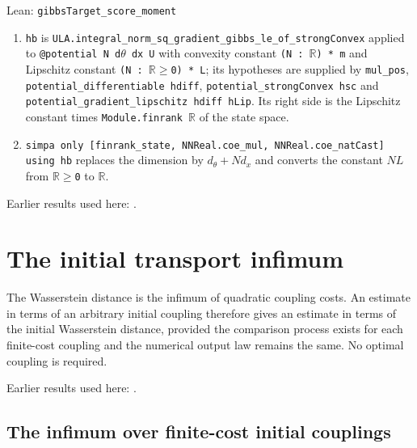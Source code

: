 \documentclass[11pt,a4paper]{report}
\begin{document}
\begin{leanbox}{Lean: \texttt{gibbsTarget\_\allowbreak{}score\_\allowbreak{}moment}}
\begin{enumerate}
\item \texttt{hb} is \texttt{ULA.\allowbreak{}integral\_\allowbreak{}norm\_\allowbreak{}sq\_\allowbreak{}gradient\_\allowbreak{}gibbs\_\allowbreak{}le\_\allowbreak{}of\_\allowbreak{}strong\allowbreak{}Convex} applied to \texttt{@potential N d\ensuremath{\theta} dx U} with convexity constant \texttt{(N : \ensuremath{\mathbb R}) * m} and Lipschitz constant \texttt{(N : \ensuremath{\mathbb R}\ensuremath{\ge}0) * L}; its hypotheses are supplied by \texttt{mul\_\allowbreak{}pos}, \texttt{potential\_\allowbreak{}differentiable hdiff}, \texttt{potential\_\allowbreak{}strong\allowbreak{}Convex hsc} and \texttt{potential\_\allowbreak{}gradient\_\allowbreak{}lipschitz hdiff h\allowbreak{}Lip}. Its right side is the Lipschitz constant times \texttt{Module.\allowbreak{}finrank \ensuremath{\mathbb R}} of the state space.

\item \texttt{simpa only [finrank\_\allowbreak{}state, NNReal.\allowbreak{}coe\_\allowbreak{}mul, NNReal.\allowbreak{}coe\_\allowbreak{}nat\allowbreak{}Cast] using hb} replaces the dimension by \(d_\theta+Nd_x\) and converts the constant \(NL\) from \texttt{\ensuremath{\mathbb R}\ensuremath{\ge}0} to \texttt{\ensuremath{\mathbb R}}.

\end{enumerate}
\end{leanbox}


Earlier results used here: \cite[Section~3.27.8]{LangevinLean2026ULASC}.
\section{\texorpdfstring{The initial transport infimum}{The initial transport infimum}}
\label{proof-module-IPLA-ReferenceFamily-lean}


The Wasserstein distance is the infimum of quadratic coupling costs. An estimate in terms of an arbitrary initial coupling therefore gives an estimate in terms of the initial Wasserstein distance, provided the comparison process exists for each finite-cost coupling and the numerical output law remains the same. No optimal coupling is required.




Earlier results used here: \cite[Section~3.47]{LangevinLean2026ULASC}.
\subsection{\texorpdfstring{The infimum over finite-cost initial couplings}{The infimum over finite-cost initial couplings}}
\label{report-step-IPLA-ReferenceFamily-lean-1}
\end{document}
